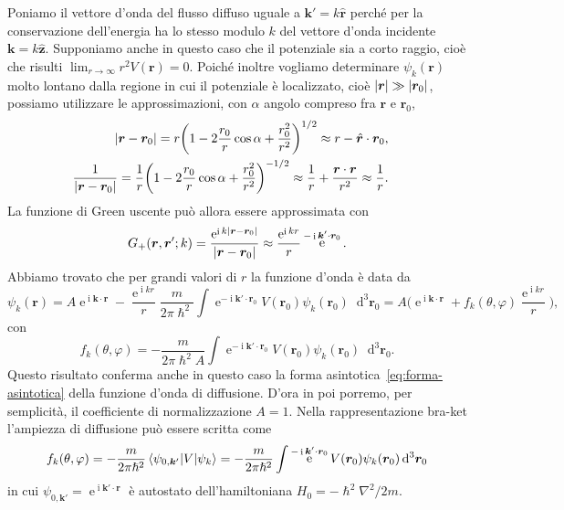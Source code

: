 \documentclass[a4paper,fleqn,twoside,12pt]{article}
\renewcommand{\phi}{\varphi}
\newcommand*{\dd}{\mathop{}\!\mathrm{d}} %
\DeclareMathOperator{\e}{\mathrm{e}} %
\DeclareMathOperator{\uimm}{\mathrm{i}} %
\DeclarePairedDelimiter{\abs}{\lvert}{\rvert}
\newcommand*{\versor}[1]{\hat{\bm{#1}}}
\begin{document}
Poniamo il vettore d'onda del flusso diffuso uguale a $\bm{k}' = k\versor{r}$
perché per la conservazione dell'energia ha lo stesso modulo $k$ del vettore
d'onda incidente $\bm{k} = k\versor{z}$.  Supponiamo anche in questo caso che il
potenziale sia a corto raggio, cioè che risulti
$\lim_{r \to \infty} r^{2}V(\bm{r}) = 0$.  Poiché inoltre vogliamo determinare
$\psi_{k}(\bm{r})$ molto lontano dalla regione in cui il potenziale è
localizzato, cioè $\abs{\bm{r}} \gg \abs{\bm{r}_{0}}$, possiamo utilizzare le
approssimazioni, con $\alpha$ angolo compreso fra $\bm{r}$ e $\bm{r}_{0}$,
\begin{subequations}
  \begin{align}
    \begin{split}
      \abs{\bm{r} - \bm{r}_{0}} &=
      r\bigg(1-2\frac{r_{0}}{r}\cos\alpha+\frac{r_{0}^{2}}{r^{2}}\bigg)^{1/2}
      \approx r - \versor{r}\cdot\bm{r}_{0},
    \end{split} \\
    \begin{split}
      \frac{1}{\abs{\bm{r} - \bm{r}_{0}}} &= \frac{1}{r}\bigg(1 -
      2\frac{r_{0}}{r}\cos\alpha + \frac{r_{0}^{2}}{r^{2}}\bigg)^{-1/2} \approx
      \frac{1}{r} + \frac{\bm{r}\cdot\bm{r}_{}}{r^{2}} \approx \frac{1}{r}.
    \end{split}
  \end{align}
\end{subequations}
La funzione di Green uscente può allora essere approssimata con
\begin{equation}
  G_{+}(\bm{r},\bm{r}';k) = \frac{\e^{\uimm k\abs{\bm{r} -
        \bm{r}_{0}}}}{\abs{\bm{r} - \bm{r}_{0}}} \approx \frac{\e^{\uimm kr}}{r}
  \e^{-\uimm \bm{k}'\cdot\bm{r}_{0}}.
\end{equation}
Abbiamo trovato che per grandi valori di $r$ la funzione d'onda è data da
\begin{equation}
  \label{eq:bar}
  \psi_{k}(\bm{r}) = A\e^{\uimm \bm{k}\cdot\bm{r}} - \frac{\e^{\uimm kr}}{r}
  \frac{m}{2\pi\hslash^{2}} \int \e^{-\uimm \bm{k}'\cdot\bm{r}_{0}}
  V(\bm{r}_{0}) \psi_{k}(\bm{r}_{0}) \dd^{3}\bm{r}_{0} = A\bigg(\e^{\uimm
    \bm{k}\cdot\bm{r}} + f_{k}(\theta,\phi)\frac{\e^{\uimm kr}}{r}\bigg),
\end{equation}
con
\begin{equation}
  f_{k}(\theta,\phi) = -\frac{m}{2\pi\hslash^{2}A} \int\e^{-\uimm
    \bm{k}'\cdot\bm{r}_{0}} V(\bm{r}_{0}) \psi_{k}(\bm{r}_{0})\dd^{3}\bm{r}_{0}.
\end{equation}
Questo risultato conferma anche in questo caso la forma
asintotica~\eqref{eq:forma-asintotica} della funzione d'onda di diffusione.
D'ora in poi porremo, per semplicità, il coefficiente di normalizzazione $A=1$.
Nella rappresentazione bra-ket l'ampiezza di diffusione può essere scritta come
\begin{equation}
  \label{eq:ampiezza-braket}
  f_{k}(\theta,\phi) = -\frac{m}{2\pi\hslash^{2}} \braket{\psi_{0,\bm{k}'} | V |
    \psi_{k}} = -\frac{m}{2\pi\hslash^{2}} \int\e^{-\uimm
    \bm{k}'\cdot\bm{r}_{0}} V(\bm{r}_{0}) \psi_{k}(\bm{r}_{0}) \dd^{3}\bm{r}_{0}
\end{equation}
in cui $\psi_{0,\bm{k'}} = \e^{\uimm \bm{k}'\cdot\bm{r}}$ è autostato
dell'hamiltoniana $H_{0} = -\hslash^{2}\nabla^{2}/2m$.
\end{document}
